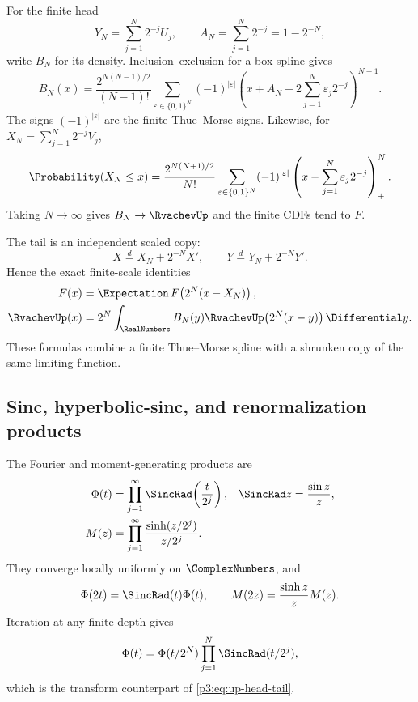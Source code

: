 \documentclass[11pt]{article}
\theoremstyle{definition}
\theoremstyle{remark}
\begin{document}
For the finite head
\[
 Y_N=\sum_{j=1}^N2^{-j}U_j,
 \qquad A_N=\sum_{j=1}^N2^{-j}=1-2^{-N},
\]
write $B_N$ for its density.  Inclusion--exclusion for a box spline gives
\begin{equation}\label{p3:eq:BN-truncated-power}
 B_N(x)=\frac{2^{N(N-1)/2}}{(N-1)!}
 \sum_{\varepsilon\in\{0,1\}^N}(-1)^{|\varepsilon|}
 \left(x+A_N-2\sum_{j=1}^N\varepsilon_j2^{-j}\right)_+^{N-1}.
\end{equation}
The signs $(-1)^{|\varepsilon|}$ are the finite Thue--Morse signs.  Likewise,
for $X_N=\sum_{j=1}^N2^{-j}V_j$,
\begin{equation}\label{p3:eq:FN-truncated-power}
 \Probability(X_N\le x)=\frac{2^{N(N+1)/2}}{N!}
 \sum_{\varepsilon\in\{0,1\}^N}(-1)^{|\varepsilon|}
 \left(x-\sum_{j=1}^N\varepsilon_j2^{-j}\right)_+^N.
\end{equation}
Taking $N\to\infty$ gives $B_N\to\RvachevUp$ and the finite CDFs tend to $F$.

The tail is an independent scaled copy:
\begin{equation}\label{p3:eq:head-tail}
 X\overset d=X_N+2^{-N}X',\qquad
 Y\overset d=Y_N+2^{-N}Y'.
\end{equation}
Hence the exact finite-scale identities
\begin{align}
 F(x)&=\Expectation\,F\!\left(2^N(x-X_N)\right),\label{p3:eq:F-head-tail}\\
 \RvachevUp(x)&=2^N\int_\RealNumbers B_N(y)\RvachevUp\!\left(2^N(x-y)\right)\Differential y.\label{p3:eq:up-head-tail}
\end{align}
These formulas combine a finite Thue--Morse spline with a shrunken copy of the
same limiting function.

\subsection{Sinc, hyperbolic-sinc, and renormalization products}

The Fourier and moment-generating products are
\begin{align}
 \Phi(t)&=\prod_{j=1}^\infty\SincRad\!\left(\frac{t}{2^j}\right),
 &\SincRad z&=\frac{\sin z}{z},\label{p3:eq:Phi-sinc-product}\\
 M(z)&=\prod_{j=1}^\infty\frac{\sinh(z/2^j)}{z/2^j}.
 \label{p3:eq:M-sinh-product}
\end{align}
They converge locally uniformly on $\ComplexNumbers$, and
\begin{equation}\label{p3:eq:renormalization-products}
 \Phi(2t)=\SincRad(t)\Phi(t),\qquad
 M(2z)=\frac{\sinh z}{z}M(z).
\end{equation}
Iteration at any finite depth gives
\begin{equation}\label{p3:eq:finite-tail-product}
 \Phi(t)=\Phi(t/2^N)\prod_{j=1}^N\SincRad(t/2^j),
\end{equation}
which is the transform counterpart of \eqref{p3:eq:up-head-tail}.
\end{document}
